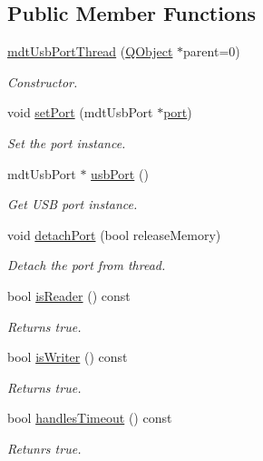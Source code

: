 \subsection*{Public Member Functions}
\begin{DoxyCompactItemize}
\item 
\hyperlink{classmdt_usb_port_thread_aaf4e5883224f05d80132b31a921ac899}{mdt\-Usb\-Port\-Thread} (\hyperlink{class_q_object}{Q\-Object} $\ast$parent=0)
\begin{DoxyCompactList}\small\item\em Constructor. \end{DoxyCompactList}\item 
void \hyperlink{classmdt_usb_port_thread_a1661f362e2d772c1524f09daa6da3f15}{set\-Port} (mdt\-Usb\-Port $\ast$\hyperlink{classmdt_port_thread_a97bff8cf6aca37d8858cc4e5c9294cae}{port})
\begin{DoxyCompactList}\small\item\em Set the port instance. \end{DoxyCompactList}\item 
mdt\-Usb\-Port $\ast$ \hyperlink{classmdt_usb_port_thread_aaa8e1ce181489dbae57c81b42dc6ad62}{usb\-Port} ()
\begin{DoxyCompactList}\small\item\em Get U\-S\-B port instance. \end{DoxyCompactList}\item 
void \hyperlink{classmdt_usb_port_thread_a99070e7dba4bd7939b054cddbd66979f}{detach\-Port} (bool release\-Memory)
\begin{DoxyCompactList}\small\item\em Detach the port from thread. \end{DoxyCompactList}\item 
bool \hyperlink{classmdt_usb_port_thread_aed82b57c84745f1e2391750697db1022}{is\-Reader} () const 
\begin{DoxyCompactList}\small\item\em Returns true. \end{DoxyCompactList}\item 
bool \hyperlink{classmdt_usb_port_thread_a74258f300967b5dea1fbfa9a0ccab38a}{is\-Writer} () const 
\begin{DoxyCompactList}\small\item\em Returns true. \end{DoxyCompactList}\item 
bool \hyperlink{classmdt_usb_port_thread_aeaa2dabc53e57f6b7cf7077d113c7f40}{handles\-Timeout} () const 
\begin{DoxyCompactList}\small\item\em Retunrs true. \end{DoxyCompactList}\end{DoxyCompactItemize}
